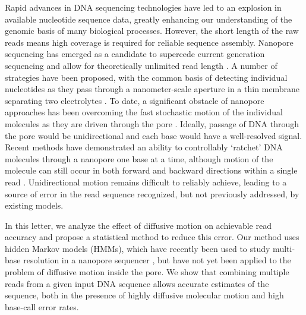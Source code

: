 \documentclass{biophys_letter}
\newcommand{\kje}[1]{\textcolor{BurntOrange}{#1}}
\begin{document}
\begin{multicols}{2}

Rapid advances in DNA sequencing technologies have led to an explosion in available nucleotide sequence data, greatly enhancing our understanding of the genomic basis of many biological processes.
However, the short length of the raw reads means high coverage is required for reliable sequence assembly.
Nanopore sequencing has emerged as a candidate to supercede current generation sequencing and allow for theoretically unlimited read length \cite{Branton:2008}.
A number of strategies have been proposed, with the common basis of detecting individual nucleotides as they pass through a nanometer-scale aperture in a thin membrane separating two electrolytes \cite{Winters-Hilt:2004}.
To date, a significant obstacle of nanopore approaches has been overcoming the fast stochastic motion of the individual molecules as they are driven through the pore \cite{Venkatesan:2011, Lu:2011}.
Ideally, passage of DNA through the pore would be unidirectional and each base would have a well-resolved signal.
Recent methods have demonstrated an ability to controllably `ratchet' DNA molecules through a nanopore one base at a time, although motion of the molecule can still occur in both forward and backward directions within a single read \cite{Luan:2011, Olasagasti:2010, Cherf:2012}.
Unidirectional motion remains difficult to reliably achieve, leading to a source of error in the read sequence \kje{recognized}, but not previously addressed, by existing models.

\kje{In this letter, we analyze the effect of diffusive motion on achievable read accuracy and propose a statistical method to reduce this error.}
Our method uses hidden Markov models (HMMs), which have recently been used to study multi-base resolution in a nanopore sequencer \cite{Timp:2012}, but have not yet been applied to the problem of diffusive motion inside the pore.
We show that combining multiple reads from a given input DNA sequence allows accurate estimates of the sequence, both in the presence of highly diffusive molecular motion and high base-call error rates.


\end{multicols}
\end{document}
